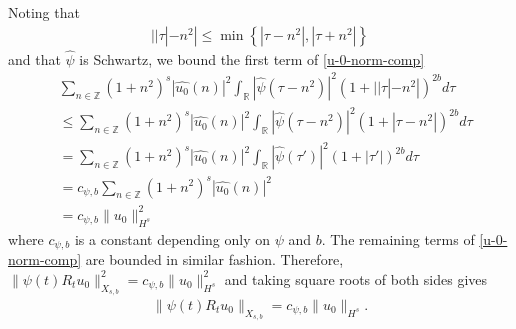 \documentclass[12pt,reqno]{amsart}
\numberwithin{equation}{section}  %
\numberwithin{figure}{section}
\newcommand{\rr}{\mathbb{R}}
\newcommand{\zz}{\mathbb{Z}}
\newcommand{\wh}{\widehat}
\begin{document}
%
Noting that
\begin{equation}
  \begin{split}
    | | \tau | - n^{2} | \le \min\left\{ | \tau - n^{2} |, | \tau + n^{2} | \right\}
  \end{split}
  \label{eqn:norm-key-ineq}
\end{equation}
%
%
and that $\wh{\psi}$ is Schwartz, we bound the first term of
\eqref{u-0-norm-comp}  
%
%
\begin{equation*}
  \begin{split}
    & \sum_{n \in \zz} \left( 1 + n^{2} \right)^{s} | \wh{u_{0}}(n)
    |^{2} \int_{\rr} | \wh{\psi}(\tau - n^{2}) |^{2}\left( 1 + | | \tau | -
    n^{2} | \right)^{2b} d \tau
    \\
    & \le  \sum_{n \in \zz} \left( 1 + n^{2} \right)^{s} | \wh{u_{0}}(n)
    |^{2} \int_{\rr} | \wh{\psi}(\tau - n^{2}) |^{2}\left( 1 +  | \tau  -
    n^{2} | \right)^{2b} d \tau
    \\
    & = \sum_{n \in \zz} \left( 1 + n^{2} \right)^{s} | \wh{u_{0}}(n)
    |^{2} \int_{\rr} | \wh{\psi}(\tau') |^{2}\left( 1 +  | \tau'| \right)^{2b} d \tau
    \\
    & = c_{\psi, b} \sum_{n \in \zz} \left( 1 + n^{2} \right)^{s} | \wh{u_{0}}(n)
    |^{2} 
    \\
    & = c_{\psi, b} \| u_{0} \|_{H^{s}}^{2}
  \end{split}
\end{equation*}
%
%
where $c_{\psi, b}$ is a constant depending only on $\psi$ and $b$. The
remaining terms of \eqref{u-0-norm-comp} are bounded in similar fashion.  
Therefore, 
$\|\psi(t) R_{t} u_{0}\|_{X_{s,b}}^{2} = c_{\psi, b}
\|u_{0}\|_{H^s}^2$ and
taking square roots of both sides gives
%
%
\begin{equation}
  \begin{split}
    \|\psi(t) R_{t} u_{0}\|_{X_{s,b}} = c_{\psi, b}
    \|u_{0}\|_{H^s}.
  \end{split}
  \label{eqn:u-0-fin-est}
\end{equation}
%
%
\end{document}

